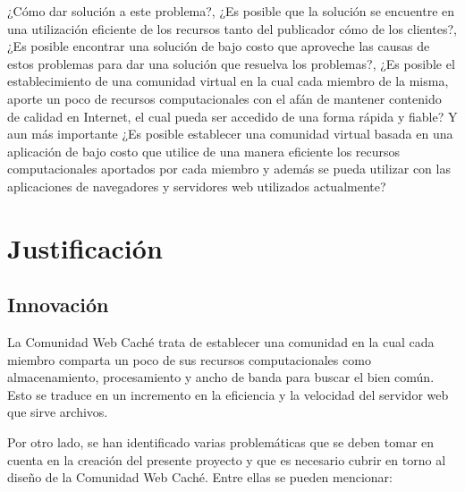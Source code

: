 ¿Cómo dar solución a este problema?, ¿Es posible que la solución se encuentre en una utilización eficiente de los recursos tanto del publicador cómo de los clientes?, ¿Es posible encontrar una solución de bajo costo que aproveche las causas de estos problemas para dar una solución que resuelva los problemas?, ¿Es posible el establecimiento de una comunidad virtual en la cual cada miembro de la misma, aporte un poco de recursos computacionales con el afán de mantener contenido de calidad en Internet, el cual pueda ser accedido de una forma rápida y fiable? Y aun más importante ¿Es posible establecer una comunidad virtual basada en una aplicación de bajo costo que utilice de una manera eficiente los recursos computacionales aportados por cada miembro y además se pueda utilizar con las aplicaciones de navegadores y servidores web utilizados actualmente?

\section{Justificación}

\subsection{Innovación}
La Comunidad Web Caché trata de establecer una comunidad en la cual cada miembro comparta un poco de sus recursos computacionales como almacenamiento, procesamiento y ancho de banda para buscar el bien común. Esto se traduce en un incremento en la eficiencia y la velocidad del servidor web que sirve archivos.

Por otro lado, se han identificado varias problemáticas que se deben tomar en cuenta en la creación del presente proyecto y que es necesario cubrir en torno al diseño de la Comunidad Web Caché. Entre ellas se pueden mencionar:

